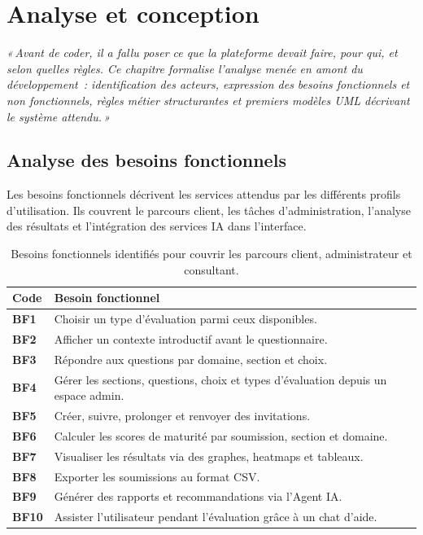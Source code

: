 \documentclass[12pt,a4paper]{report}
\newcommand{\chapterintro}[1]{
    \vspace*{4cm}
    \begin{center}
        \begin{minipage}{0.78\textwidth}
            \centering
            \itshape «\,#1\,»
        \end{minipage}
    \end{center}
    \clearpage
}
\begin{document}
\chapter{Analyse et conception}
\chapterintro{Avant de coder, il a fallu poser ce que la plateforme devait faire, pour qui, et selon quelles règles. Ce chapitre formalise l'analyse menée en amont du développement~: identification des acteurs, expression des besoins fonctionnels et non fonctionnels, règles métier structurantes et premiers modèles UML décrivant le système attendu.}

\section{Analyse des besoins fonctionnels}
Les besoins fonctionnels décrivent les services attendus par les différents profils d'utilisation. Ils couvrent le parcours client, les tâches d'administration, l'analyse des résultats et l'intégration des services IA dans l'interface.

\begin{table}[H]
\centering
\caption{Besoins fonctionnels identifiés pour couvrir les parcours client, administrateur et consultant.}
\begin{tabularx}{\textwidth}{>{\bfseries}L{2cm}Y}
\toprule
Code & Besoin fonctionnel \\
\midrule
BF1 & Choisir un type d'évaluation parmi ceux disponibles. \\
BF2 & Afficher un contexte introductif avant le questionnaire. \\
BF3 & Répondre aux questions par domaine, section et choix. \\
BF4 & Gérer les sections, questions, choix et types d'évaluation depuis un espace admin. \\
BF5 & Créer, suivre, prolonger et renvoyer des invitations. \\
BF6 & Calculer les scores de maturité par soumission, section et domaine. \\
BF7 & Visualiser les résultats via des graphes, heatmaps et tableaux. \\
BF8 & Exporter les soumissions au format CSV. \\
BF9 & Générer des rapports et recommandations via l'Agent IA. \\
BF10 & Assister l'utilisateur pendant l'évaluation grâce à un chat d'aide. \\
\bottomrule
\end{tabularx}
\end{table}
\end{document}
